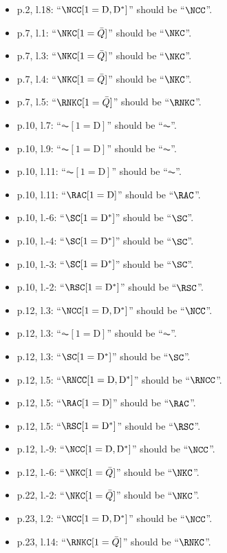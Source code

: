 \documentclass{amsart}
\theoremstyle{definition}
\newcommand{\dual}{^*} %
\newcommand{\dissection}{\mathrm{D}} %
\begin{document}
\begin{enumerate}
\begin{itemize}
    \item p.2, l.18: ``$\NCC[1=\dissection,\dissection\dual]$'' should be ``$\NCC$''.
    \item p.7, l.1: ``$\NKC[1=\bar Q]$'' should be ``$\NKC$''.
    \item p.7, l.3: ``$\NKC[1=\bar Q]$'' should be ``$\NKC$''.
    \item p.7, l.4: ``$\NKC[1=\bar Q]$'' should be ``$\NKC$''.
    \item p.7, l.5: ``$\RNKC[1=\bar Q]$'' should be ``$\RNKC$''.
    \item p.10, l.7: ``$\AC[1=\dissection]$'' should be ``$\AC$''.
    \item p.10, l.9: ``$\AC[1=\dissection]$'' should be ``$\AC$''.
    \item p.10, l.11: ``$\AC[1=\dissection]$'' should be ``$\AC$''.
    \item p.10, l.11: ``$\RAC[1=\dissection]$'' should be ``$\RAC$''.
    \item p.10, l.-6: ``$\SC[1=\dissection\dual]$'' should be ``$\SC$''.
    \item p.10, l.-4: ``$\SC[1=\dissection\dual]$'' should be ``$\SC$''.
    \item p.10, l.-3: ``$\SC[1=\dissection\dual]$'' should be ``$\SC$''.
    \item p.10, l.-2: ``$\RSC[1=\dissection\dual]$'' should be ``$\RSC$''.
    \item p.12, l.3: ``$\NCC[1=\dissection,\dissection\dual]$'' should be ``$\NCC$''.
    \item p.12, l.3: ``$\AC[1=\dissection]$'' should be ``$\AC$''.
    \item p.12, l.3: ``$\SC[1=\dissection\dual]$'' should be ``$\SC$''.
    \item p.12, l.5: ``$\RNCC[1=\dissection,\dissection\dual]$'' should be ``$\RNCC$''.
    \item p.12, l.5: ``$\RAC[1=\dissection]$'' should be ``$\RAC$''.
    \item p.12, l.5: ``$\RSC[1=\dissection\dual]$'' should be ``$\RSC$''.
    \item p.12, l.-9: ``$\NCC[1=\dissection,\dissection\dual]$'' should be ``$\NCC$''.
    \item p.12, l.-6: ``$\NKC[1=\bar Q]$'' should be ``$\NKC$''.
    \item p.22, l.-2: ``$\NKC[1=\bar Q]$'' should be ``$\NKC$''.
    \item p.23, l.2: ``$\NCC[1=\dissection,\dissection\dual]$'' should be ``$\NCC$''.
    \item p.23, l.14: ``$\RNKC[1=\bar Q]$'' should be ``$\RNKC$''.

\end{itemize}
\end{enumerate}
\end{document}
